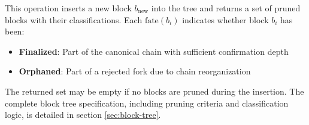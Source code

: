 This operation inserts a new block $b_{\text{new}}$ into the tree and returns a set of pruned blocks with their classifications. Each $\text{fate}(b_i)$ indicates whether block $b_i$ has been:
\begin{itemize}
    \item \textbf{Finalized}: Part of the canonical chain with sufficient confirmation depth
    \item \textbf{Orphaned}: Part of a rejected fork due to chain reorganization
\end{itemize}

The returned set may be empty if no blocks are pruned during the insertion. The complete block tree specification, including pruning criteria and classification logic, is detailed in section \ref{sec:block-tree}.
